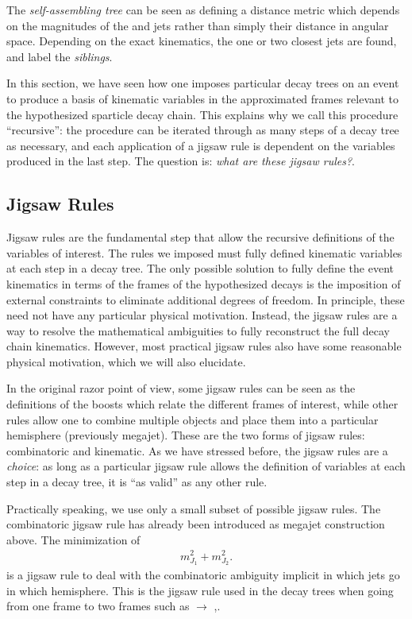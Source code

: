 The \textit{self-assembling tree} can be seen as defining a distance metric which depends on the magnitudes of the \met and jets rather than simply their distance in angular space.
Depending on the exact kinematics, the one or two closest jets are found, and label the \met \textit{siblings}.

In this section, we have seen how one imposes particular decay trees on an event to produce a basis of kinematic variables in the approximated frames relevant to the hypothesized sparticle decay chain.
This explains why we call this procedure ``recursive'': the procedure can be iterated through as many steps of a decay tree as necessary, and each application of a jigsaw rule is dependent on the variables produced in the last step.
The question is: \textit{what are these jigsaw rules?}.

\subsection{Jigsaw Rules}

Jigsaw rules are the fundamental step that allow the recursive definitions of the variables of interest.
The rules we imposed must fully defined kinematic variables at each step in a decay tree.
The only possible solution to fully define the event kinematics in terms of the frames of the hypothesized decays is the imposition of external constraints to eliminate additional degrees of freedom.
In principle, these need not have any particular physical motivation.
Instead, the jigsaw rules are a way to resolve the mathematical ambiguities to fully reconstruct the full decay chain kinematics.
However, most practical jigsaw rules also have some reasonable physical motivation, which we will also elucidate.

In the original razor point of view, some jigsaw rules can be seen as the definitions of the boosts which relate the different frames of interest, while other rules allow one to combine multiple objects and place them into a particular hemisphere (previously megajet).
These are the two forms of jigsaw rules: combinatoric and kinematic.
As we have stressed before, the jigsaw rules are a \textit{choice}: as long as a particular jigsaw rule allows the definition of variables at each step in a decay tree, it is ``as valid'' as any other rule.

Practically speaking, we use only a small subset of possible jigsaw rules.
The combinatoric jigsaw rule has already been introduced as megajet construction above.
The minimization of
\begin{align}
m_{J_1}^2 + m_{J_2}^2.
\end{align}
is a jigsaw rule to deal with the combinatoric ambiguity implicit in which jets go in which hemisphere.
This is the jigsaw rule used in the decay trees when going from one frame to two frames such as \PP $\rightarrow$ \Pa,\Pb.

